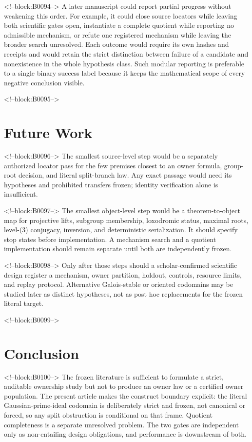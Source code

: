 \documentclass[11pt,a4paper]{article}
\begin{document}
<!--block:B0094-->
A later manuscript could report partial progress without weakening this order. For example, it could close source locators while leaving both scientific gates open, instantiate a complete quotient while reporting no admissible mechanism, or refute one registered mechanism while leaving the broader search unresolved. Each outcome would require its own hashes and receipts and would retain the strict distinction between failure of a candidate and nonexistence in the whole hypothesis class. Such modular reporting is preferable to a single binary success label because it keeps the mathematical scope of every negative conclusion visible.

<!--block:B0095-->
\section{Future Work}

<!--block:B0096-->
The smallest source-level step would be a separately authorized locator pass for the few premises closest to an owner formula, group-root decision, and literal split-branch law. Any exact passage would need its hypotheses and prohibited transfers frozen; identity verification alone is insufficient.

<!--block:B0097-->
The smallest object-level step would be a theorem-to-object map for projective lifts, subgroup membership, loxodromic status, maximal roots, level-(3) conjugacy, inversion, and deterministic serialization. It should specify stop states before implementation. A mechanism search and a quotient implementation should remain separate until both are independently frozen.

<!--block:B0098-->
Only after those steps should a scholar-confirmed scientific design register a mechanism, owner partition, holdout, controls, resource limits, and replay protocol. Alternative Galois-stable or oriented codomains may be studied later as distinct hypotheses, not as post hoc replacements for the frozen literal target.

<!--block:B0099-->
\section{Conclusion}

<!--block:B0100-->
The frozen literature is sufficient to formulate a strict, auditable ownership study but not to produce an owner law or a certified owner population. The present article makes the construct boundary explicit: the literal Gaussian-prime-ideal codomain is deliberately strict and frozen, not canonical or forced, so any split obstruction is conditional on that frame. Quotient completeness is a separate unresolved problem. The two gates are independent only as non-entailing design obligations, and performance is downstream of both.
\end{document}
